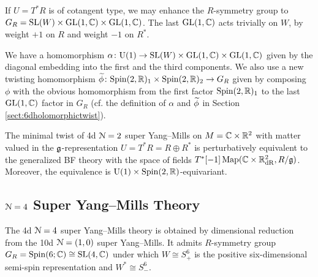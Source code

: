 \documentclass[10pt, oneside]{article}
\begin{document}
If $U = T^* R$ is of cotangent type, we may enhance the $R$-symmetry group to $G_R=\mathrm{SL}(W)\times \mathrm{GL}(1, \mathbb C)\times \mathrm{GL}(1, \mathbb C)$. The last $\mathrm{GL}(1, \mathbb C)$ acts trivially on $W$, by weight $+1$ on $R$ and weight $-1$ on $R^*$.

We have a homomorphism $\alpha\colon \mathrm{U}(1)\rightarrow  \mathrm{SL}(W)\times \mathrm{GL}(1, \mathbb C) \times \mathrm{GL}(1, \mathbb C)$ given by the diagonal embedding into the first and the third components. We also use a new twisting homomorphism $\widetilde{\phi}\colon \mathrm{Spin}(2, \mathbb R)_1 \times \mathrm{Spin}(2, \mathbb R)_2\rightarrow G_R$ given by composing $\phi$ with the obvious homomorphism from the first factor $\mathrm{Spin}(2, \mathbb R)_1$ to the last $\mathrm{GL}(1, \mathbb C)$ factor in $G_R$ (cf. the definition of $\alpha$ and $\widetilde{\phi}$ in Section \ref{sect:6dholomorphictwist}).

\begin{theorem}\label{thm:4d_11_twistgraded}
The minimal twist of 4d $\mathcal N=2$ super Yang--Mills on $M=\mathbb C \times \mathbb R^2$ with matter valued in the $\mathfrak g$-representation $U=T^* R=R\oplus R^*$ is perturbatively equivalent to the generalized BF theory with the space of fields $T^*[-1]\operatorname{Map}(\mathbb C \times \mathbb R^2_{\mathrm{dR}}, R/\mathfrak g)$. Moreover, the equivalence is $\mathrm{U}(1)\times \mathrm{Spin}(2, \mathbb R)$-equivariant.
\end{theorem}

\subsection{\texorpdfstring{$\mathcal N=4$}{N=4} Super Yang--Mills Theory} \label{4d_4_section}

The 4d $\mathcal N=4$ super Yang--Mills theory is obtained by dimensional reduction from the 10d $\mathcal N=(1, 0)$ super Yang--Mills. It admits $R$-symmetry group $G_R=\mathrm{Spin}(6; \mathbb C)\cong \mathrm{SL}(4, \mathbb C)$ under which $W \cong S_+^6$ is the positive six-dimensional semi-spin representation and $W^* \cong S_-^6$. 
\end{document}
